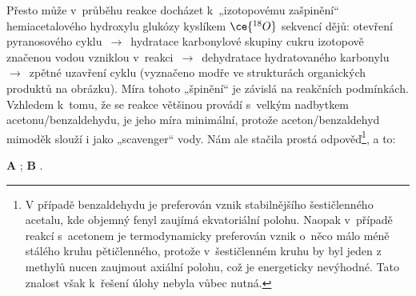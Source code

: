 \documentclass{book}
\let\ch\undefined
\begin{document}
Přesto může v~průběhu reakce docházet k~„izotopovému zašpinění“ hemiacetalového
hydroxylu glukózy kyslíkem $\ce{^{18}O}$ sekvencí dějů: otevření pyranosového
cyk\-lu\ $\rightarrow$\ hyd\-ra\-tace karbonylové skupiny cukru izotopově značenou
vodou vzniklou v~re\-ak\-ci\ $\rightarrow$\ dehydratace hydratovaného karbonylu\ $\rightarrow$\ zpětné
uzavření cyklu (vyznačeno modře ve strukturách organických produktů
na obrázku). Míra tohoto „špinění“ je závislá na reakčních podmínkách.
Vzhledem k~tomu, že se reakce většinou provádí s~velkým nadbytkem
acetonu/benzaldehydu, je jeho míra minimální, protože aceton/benzaldehyd
mimoděk slouží i jako „scavenger“ vody. Nám ale stačila prostá odpověď\footnote{V případě benzaldehydu je preferován vznik stabilnějšího šestičlenného
acetalu, kde objemný fenyl zaujímá ekvatoriální polohu. Naopak v~případě
reakcí s~acetonem je termodynamicky preferován vznik o~něco málo méně
stálého kruhu pětičlenného, protože v~šestičlenném kruhu by byl jeden
z methylů nucen zaujmout axiální polohu, což je energeticky nevýhodné.
Tato znalost však k~řešení úlohy nebyla vůbec nutná.}, a to: 

\textbf{A} \ch{H2\-^{18}O}; \textbf{B} \ch{H2\-^{18}O}.
\end{document}
